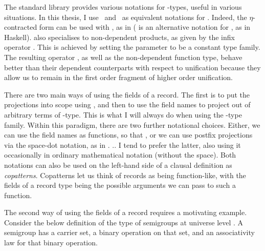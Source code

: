 The standard library provides various notations for
\AgdaRecord{$\Upsigma$}-types, useful in various situations.
In this thesis, I use \ and
\ as equivalent notations for
\AgdaRecord{$\Upsigma$}\AgdaSpace{}\AgdaSpace{}.
Indeed, the $\eta$-contracted form can be used with \AgdaFunction{$\exists$}, as
in \AgdaFunction{$\exists$}\AgdaSpace{} (\AgdaSymbol{\textbackslash}
is an alternative notation for \AgdaSymbol{$\uplambda$}, as in Haskell).
\AgdaRecord{$\Upsigma$} also specialises to non-dependent products, as given by
the infix operator \AgdaFunction{\_$\times$\_}.
This is achieved by setting the parameter  to be a constant type
family.
The resulting operator \AgdaFunction{\_$\times$\_}, as well as the non-dependent
function type, behave better than their dependent counterparts with respect to
unification because they allow us to remain in the first order fragment of
higher order unification.

There are two main ways of using the fields of a record.
The first is to put the projections into scope using
\AgdaSpace{}\AgdaRecord{$\Upsigma$}, and then to use the field
names to project out of arbitrary terms of \AgdaRecord{$\Upsigma$}-type.
This is what I will always do when using the \AgdaRecord{$\Upsigma$}-type
family.
Within this paradigm, there are two further notational choices.
Either, we can use the field names as functions, so that
\AgdaSpace{}\AgdaSymbol{=}\AgdaSpace{}%
\AgdaSpace{}\AgdaSpace{}\AgdaOperator{\AgdaInductiveConstructor,}%
\AgdaSpace{}\AgdaSpace{},
or we can use postfix projections via the space-dot notation, as in
\AgdaSpace{}\AgdaSymbol{=}\AgdaSpace{}%
\AgdaSpace{}\AgdaSymbol.\AgdaSpace{}%
\AgdaOperator{\AgdaInductiveConstructor,}\AgdaSpace{}%
\AgdaSpace{}\AgdaSymbol..
I tend to prefer the latter, also using it occasionally in ordinary mathematical
notation (without the space).
Both notations can also be used on the left-hand side of a clausal definition as
\emph{copatterns}.
Copatterns let us think of records as being function-like, with the fields of a
record type being the possible arguments we can pass to such a function.

The second way of using the fields of a record requires a motivating example.
Consider the below definition of the type of semigroups at universe level
\AgdaBound{$\ell$}.
A semigroup has a carrier set, a binary operation on that set, and an
associativity law for that binary operation.

